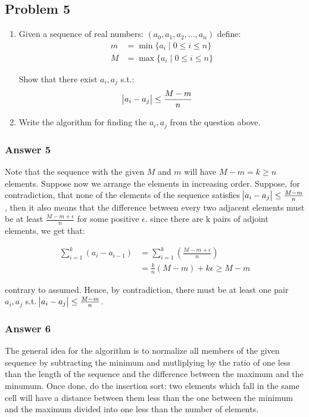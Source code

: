 \documentclass[11pt]{article}
\begin{document}
\subsection{Problem 5}
\label{sec-1-5}
\begin{enumerate}
\item Given a sequence of real numbers: $(a_0, a_1, a_2, \dots, a_n)$ define:
\begin{align*}
  m &= \min\{a_i\;|\; 0 \leq i \leq n\} \\
  M &= \max\{a_i\;|\; 0 \leq i \leq n\}
\end{align*}

Show that there exist $a_i, a_j$ s.t.:
\begin{align*}
  \abs{a_i - a_j} &\leq \frac{M - m}{n}
\end{align*}

\item Write the algorithm for finding the $a_i, a_j$ from the question above.
\end{enumerate}

\subsubsection{Answer 5}
\label{sec-1-5-1}
Note that the sequence with the given $M$ and $m$ will have $M - m = k \geq
    n$ elements.  Suppose now we arrange the elements in increasing order.
Suppose, for contradiction, that none of the elements of the sequence
satisfies $\abs{a_i - a_j} \leq \frac{M - m}{n}$, then it also means that
the difference between every two adjacent elements must be at least
$\frac{M - m + \epsilon}{n}$ for some positive $\epsilon$.  since there are
k pairs of adjoint elements, we get that:

\begin{align*}
  \sum_{i=1}^k\left(a_i - a_{i-1}\right) &= \sum_{i=1}^k\left(\frac{M - m + \epsilon}{n}\right) \\
  &= \frac{k}{n}\left(M - m\right) + k \epsilon \geq M - m
\end{align*}

contrary to assumed.  Hence, by contradiction, there must be at least one
pair $a_i, a_j$ s.t. $\abs{a_i - a_j} \leq \frac{M - m}{n}$.

\subsubsection{Answer 6}
\label{sec-1-5-2}
The general idea for the algorithm is to normalize all members of the given
sequence by subtracting the minimum and mutliplying by the ratio of one less
than the length of the sequence and the difference between the maximum and
the minumum.  Once done, do the insertion sort: two elements which fall in
the same cell will have a distance between them less than the one between
the minimum and the maximum divided into one less than the number of elements.
\end{document}
